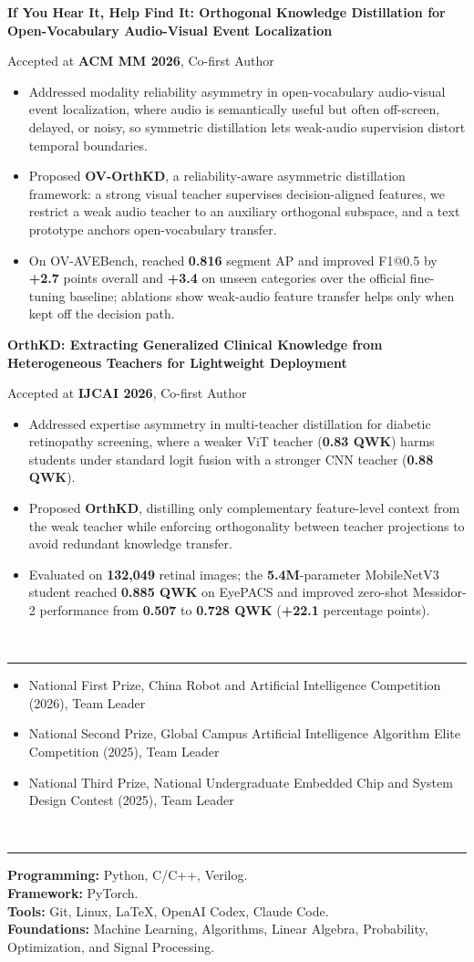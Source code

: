 \documentclass[10pt]{article}
\newcommand{\cvsection}[1]{%
  \par\vspace{1pt}%
  \noindent{\large\bfseries #1}\\[-4.5pt]%
  \noindent\rule{\textwidth}{0.4pt}\par\vspace{0pt}%
}
\newcommand{\researchblock}[3]{%
  \textbf{#1}\par
  #2\par
  \begin{itemize}#3\end{itemize}%
}
\begin{document}
\researchblock{If You Hear It, Help Find It: Orthogonal Knowledge Distillation for Open-Vocabulary Audio-Visual Event Localization}{Accepted at \textbf{ACM MM 2026}, Co-first Author}{
  \item Addressed modality reliability asymmetry in open-vocabulary audio-visual event localization, where audio is semantically useful but often off-screen, delayed, or noisy, so symmetric distillation lets weak-audio supervision distort temporal boundaries.
  \item Proposed \textbf{OV-OrthKD}, a reliability-aware asymmetric distillation framework: a strong visual teacher supervises decision-aligned features, we restrict a weak audio teacher to an auxiliary orthogonal subspace, and a text prototype anchors open-vocabulary transfer.
  \item On OV-AVEBench, reached \textbf{0.816} segment AP and improved F1@0.5 by \textbf{+2.7} points overall and \textbf{+3.4} on unseen categories over the official fine-tuning baseline; ablations show weak-audio feature transfer helps only when kept off the decision path.
}
\researchblock{OrthKD: Extracting Generalized Clinical Knowledge from Heterogeneous Teachers for Lightweight Deployment}{Accepted at \textbf{IJCAI 2026}, Co-first Author}{
  \item Addressed expertise asymmetry in multi-teacher distillation for diabetic retinopathy screening, where a weaker ViT teacher (\textbf{0.83 QWK}) harms students under standard logit fusion with a stronger CNN teacher (\textbf{0.88 QWK}).
  \item Proposed \textbf{OrthKD}, distilling only complementary feature-level context from the weak teacher while enforcing orthogonality between teacher projections to avoid redundant knowledge transfer.
  \item Evaluated on \textbf{132{,}049} retinal images; the \textbf{5.4M}-parameter MobileNetV3 student reached \textbf{0.885 QWK} on EyePACS and improved zero-shot Messidor-2 performance from \textbf{0.507} to \textbf{0.728 QWK} (\textbf{+22.1} percentage points).
}
\cvsection{Awards}
\begin{itemize}
  \item National First Prize, China Robot and Artificial Intelligence Competition (2026), Team Leader
  \item National Second Prize, Global Campus Artificial Intelligence Algorithm Elite Competition (2025), Team Leader
  \item National Third Prize, National Undergraduate Embedded Chip and System Design Contest (2025), Team Leader
\end{itemize}
\cvsection{Skills}
\textbf{Programming:} Python, C/C++, Verilog.\\
\textbf{Framework:} PyTorch.\\
\textbf{Tools:} Git, Linux, LaTeX, OpenAI Codex, Claude Code.\\
\textbf{Foundations:} Machine Learning, Algorithms, Linear Algebra, Probability, Optimization, and Signal Processing.
\end{document}
